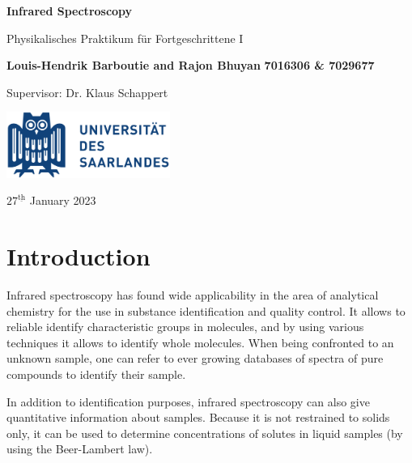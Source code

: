 \documentclass[12pt]{article}
\begin{document}
\pagestyle{fancy}
\setlength{\headheight}{15pt}


\begin{titlepage}
    \begin{center}
        \vspace*{1cm}
        \Huge
        \textbf{Infrared Spectroscopy}
        
        \vspace{0.5cm}
        \LARGE
        Physikalisches Praktikum für Fortgeschrittene I
        
        \vspace{1.5cm}
        \textbf{Louis-Hendrik Barboutie and Rajon Bhuyan} \newline
        \textbf{7016306 \& 7029677}
        
        \vspace{0.5cm}
        \Large 
        Supervisor: Dr. Klaus Schappert
        
        \vfill

        \includegraphics[width=0.4\textwidth]{logo_uni.png}
        
        \Large
        $27^{\underline{\text{th}}}$ January 2023
    \end{center}
\end{titlepage}

\tableofcontents
\newpage

\section{Introduction}
Infrared spectroscopy has found wide applicability in the area of analytical chemistry for the use in substance identification and quality control. It allows to reliable identify characteristic groups in molecules, and by using various techniques it allows to identify whole molecules. When being confronted to an unknown sample, one can refer to ever growing databases of spectra of pure compounds to identify their sample. 

In addition to identification purposes, infrared spectroscopy can also give quantitative information about samples. Because it is not restrained to solids only, it can be used to determine concentrations of solutes in liquid samples (by using the Beer-Lambert law).
\end{document}
